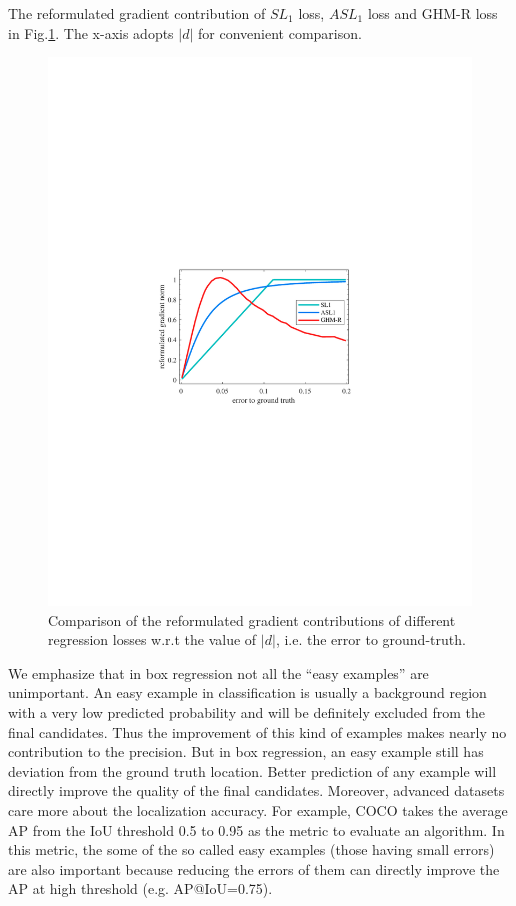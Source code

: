 \documentclass[letterpaper]{article} %
\begin{document}
The reformulated gradient contribution of $SL_1$ loss, $ASL_1$ loss and GHM-R loss in Fig.\ref{fig:reg_grads}. The x-axis adopts $|d|$ for convenient comparison.
\begin{figure}[ht]
\centering
\includegraphics[width=0.8\linewidth]{figs/reg_grads}
\caption{Comparison of the reformulated gradient contributions of different regression losses w.r.t the value of $|d|$, i.e. the error to ground-truth.}
\label{fig:reg_grads}
\end{figure}

We emphasize that in box regression not all the ``easy examples'' are unimportant. An easy example in classification is usually a background region with a very low predicted probability and will be definitely excluded from the final candidates. Thus the improvement of this kind of examples makes nearly no contribution to the precision. But in box regression, an easy example still has deviation from the ground truth location. Better prediction of any example will directly improve the quality of the final candidates. 
Moreover, advanced datasets care more about the localization accuracy. For example, COCO \cite{coco} takes the average AP from the IoU threshold 0.5 to 0.95 as the metric to evaluate an algorithm. In this metric, the some of the so called easy examples (those having small errors) are also important because reducing the errors of them can directly improve the AP at high threshold (e.g. AP@IoU=0.75). 
\end{document}
